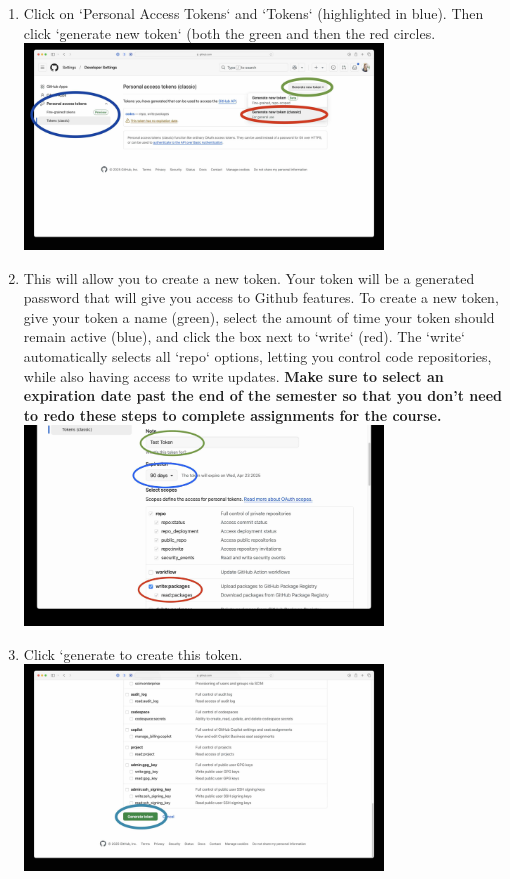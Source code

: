 \documentclass{article} %
\begin{document}
\begin{enumerate}
    \item Click on `Personal Access Tokens` and `Tokens` (highlighted in blue).  Then click `generate new token` (both the green and then the red circles.\\
    \includegraphics[width=0.75\textwidth]{figs/4createnew.jpg}

    \item This will allow you to create a new token.  Your token will be a generated password that will give you access to Github features.  To create a new token, give your token a name (green), select the amount of time your token should remain active (blue), and click the box next to `write` (red).  The `write` automatically selects all `repo` options, letting you control code repositories, while also having access to write updates.  \textbf{Make sure to select an expiration date past the end of the semester so that you don't need to redo these steps to complete assignments for the course.}\\
    \includegraphics[width=0.75\textwidth]{figs/5token.jpg}

    \item Click `generate to create this token.\\
    \includegraphics[width=0.75\textwidth]{figs/6generate.jpg}


\end{enumerate}
\end{document}
